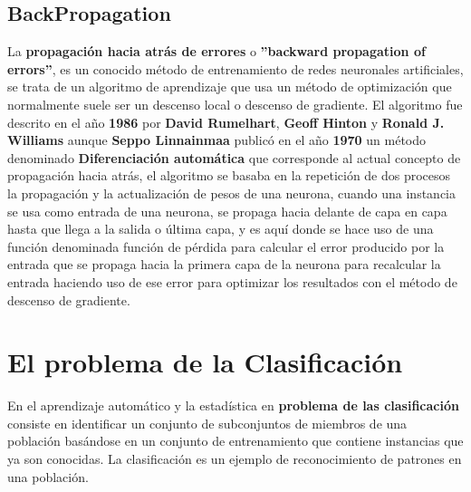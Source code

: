 \documentclass[a4paper, 11pt]{article} %
\begin{document}
\subsection{BackPropagation}
La \textbf{propagación hacia atrás de errores} o \textbf{''backward propagation of errors''}, es un conocido método de entrenamiento de redes neuronales artificiales, se trata de un algoritmo de aprendizaje que usa un método de optimización que normalmente suele ser un descenso local o descenso de gradiente. El algoritmo fue descrito en el año \textbf{1986} por \textbf{David Rumelhart}, \textbf{Geoff Hinton} y \textbf{Ronald J. Williams} aunque \textbf{Seppo Linnainmaa} publicó en el año \textbf{1970} un método denominado \textbf{Diferenciación automática} que corresponde al actual concepto de propagación hacia atrás, el algoritmo se basaba en la repetición de dos procesos la propagación y la actualización de pesos de una neurona, cuando una instancia se usa como entrada de una neurona, se propaga hacia delante de capa en capa hasta que llega a la salida o última capa, y es aquí donde se hace uso de una función denominada función de pérdida para calcular el error producido por la entrada que se propaga hacia la primera capa de la neurona para recalcular la entrada haciendo uso de ese error para optimizar los resultados con el método de descenso de gradiente.

\section{El problema de la Clasificación}
En el aprendizaje automático y la estadística en \textbf{problema de las clasificación} consiste en identificar un conjunto de subconjuntos de miembros de una población basándose en un conjunto de entrenamiento que contiene instancias que ya son conocidas. La clasificación es un ejemplo de reconocimiento de patrones en una población.
\end{document}
